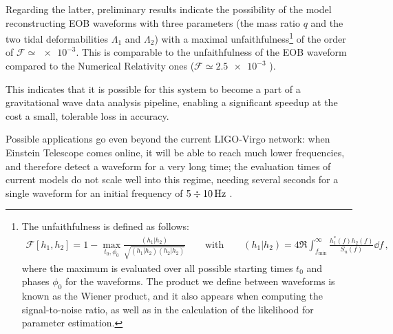 \documentclass[11pt]{article}
\begin{document}
Regarding the latter, preliminary results indicate the possibility of the model reconstructing EOB waveforms with three parameters (the mass ratio \(q\) and the two tidal deformabilities \(\Lambda_1\) and \(\Lambda_2 \)) with a maximal unfaithfulness\footnote{The unfaithfulness is defined as follows: 
%
\begin{align}
\mathcal{F} [h_1 , h_2 ] = 1 - \max_{t_0, \phi_0 } \frac{(h_1 | h_2 )}{\sqrt{(h_1 | h_2 ) (h_2 | h_2 )}}
\qquad \text{with} \qquad
(h_1 | h_2 ) = 4 \Re \int_{f _{\text{min}}}^{\infty } \frac{h_1^{*} (f) h_2 (f)}{S_n (f)} \dd{f}
\,,
\end{align}
%
where the maximum is evaluated over all possible starting times \(t_0 \) and phases \(\phi_0 \) for the waveforms. The product we define between waveforms is known as the Wiener product, and it also appears when computing the signal-to-noise ratio, as well as in the calculation of the likelihood for parameter estimation. 
} of the order of \(\mathcal{F} \simeq \num{e-3}\).
This is comparable to the unfaithfulness of the EOB waveform compared to the Numerical Relativity ones (\(\mathcal{F} \simeq \num{2.5e-3}\) \cite[]{nagarTimedomainEffectiveonebodyGravitational2018}).

This indicates that it is possible for this system to become a part of a gravitational wave data analysis pipeline, enabling a significant speedup at the cost a small, tolerable loss in accuracy.


Possible applications go even beyond the current LIGO-Virgo network: when Einstein Telescope comes online, it will be able to reach much lower frequencies, and therefore detect a waveform for a very long time; the evaluation times of current models do not scale well into this regime, needing several seconds for a single waveform for an initial frequency of \(5 \divisionsymbol \SI{10}{Hz}\) \cite[fig.\ 2]{gambaFastFaithfulFrequencydomain2020}. 

\printbibliography
\end{document}
